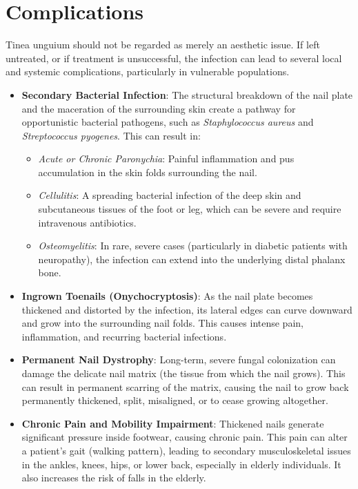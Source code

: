 \section*{Complications}
Tinea unguium should not be regarded as merely an aesthetic issue. If left untreated, or if treatment is unsuccessful, the infection can lead to several local and systemic complications, particularly in vulnerable populations.

\begin{itemize}
    \item \textbf{Secondary Bacterial Infection}: The structural breakdown of the nail plate and the maceration of the surrounding skin create a pathway for opportunistic bacterial pathogens, such as \textit{Staphylococcus aureus} and \textit{Streptococcus pyogenes}. This can result in:
    \begin{itemize}
        \item \textit{Acute or Chronic Paronychia}: Painful inflammation and pus accumulation in the skin folds surrounding the nail.
        \item \textit{Cellulitis}: A spreading bacterial infection of the deep skin and subcutaneous tissues of the foot or leg, which can be severe and require intravenous antibiotics.
        \item \textit{Osteomyelitis}: In rare, severe cases (particularly in diabetic patients with neuropathy), the infection can extend into the underlying distal phalanx bone.
    \end{itemize}
    \item \textbf{Ingrown Toenails (Onychocryptosis)}: As the nail plate becomes thickened and distorted by the infection, its lateral edges can curve downward and grow into the surrounding nail folds. This causes intense pain, inflammation, and recurring bacterial infections.
    \item \textbf{Permanent Nail Dystrophy}: Long-term, severe fungal colonization can damage the delicate nail matrix (the tissue from which the nail grows). This can result in permanent scarring of the matrix, causing the nail to grow back permanently thickened, split, misaligned, or to cease growing altogether.
    \item \textbf{Chronic Pain and Mobility Impairment}: Thickened nails generate significant pressure inside footwear, causing chronic pain. This pain can alter a patient's gait (walking pattern), leading to secondary musculoskeletal issues in the ankles, knees, hips, or lower back, especially in elderly individuals. It also increases the risk of falls in the elderly.

\end{itemize}
